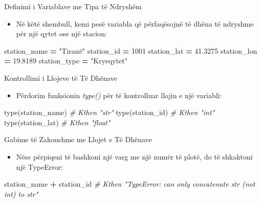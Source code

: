 \documentclass[
  ignorenonframetext,
]{beamer}
\newenvironment{Shaded}{\begin{snugshade}}{\end{snugshade}}
\newcommand{\BuiltInTok}[1]{#1}
\newcommand{\CommentTok}[1]{\textcolor[rgb]{0.56,0.35,0.01}{\textit{#1}}}
\newcommand{\DecValTok}[1]{\textcolor[rgb]{0.00,0.00,0.81}{#1}}
\newcommand{\FloatTok}[1]{\textcolor[rgb]{0.00,0.00,0.81}{#1}}
\newcommand{\NormalTok}[1]{#1}
\newcommand{\OperatorTok}[1]{\textcolor[rgb]{0.81,0.36,0.00}{\textbf{#1}}}
\newcommand{\StringTok}[1]{\textcolor[rgb]{0.31,0.60,0.02}{#1}}
\providecommand{\tightlist}{%
  \setlength{\itemsep}{0pt}\setlength{\parskip}{0pt}}
\begin{document}
\begin{frame}[fragile]{Definimi i Variablave me Tipa të Ndryshëm}
\protect\hypertarget{definimi-i-variablave-me-tipa-tuxeb-ndryshuxebm}{}
\begin{itemize}
\tightlist
\item
  Në këtë shembull, kemi pesë variabla që përfaqësojnë të dhëna të
  ndryshme për një qytet ose një stacion:
\end{itemize}

\begin{Shaded}
\begin{Highlighting}[]
\NormalTok{  station\_name }\OperatorTok{=} \StringTok{"Tiranë"}
\NormalTok{  station\_id }\OperatorTok{=} \DecValTok{1001}
\NormalTok{  station\_lat }\OperatorTok{=} \FloatTok{41.3275}
\NormalTok{  station\_lon }\OperatorTok{=} \FloatTok{19.8189}
\NormalTok{  station\_type }\OperatorTok{=} \StringTok{"Kryeqytet"}
\end{Highlighting}
\end{Shaded}
\end{frame}

\begin{frame}[fragile]{Kontrollimi i Llojeve të Të Dhënave}
\protect\hypertarget{kontrollimi-i-llojeve-tuxeb-tuxeb-dhuxebnave}{}
\begin{itemize}
\tightlist
\item
  Përdorim funksionin \emph{type()} për të kontrolluar llojin e një
  variabli:
\end{itemize}

\begin{Shaded}
\begin{Highlighting}[]
\BuiltInTok{type}\NormalTok{(station\_name)  }\CommentTok{\# Kthen "str"}
\BuiltInTok{type}\NormalTok{(station\_id)  }\CommentTok{\# Kthen "int"}
\BuiltInTok{type}\NormalTok{(station\_lat)  }\CommentTok{\# Kthen "float"}
\end{Highlighting}
\end{Shaded}
\end{frame}

\begin{frame}[fragile]{Gabime të Zakonshme me Llojet e Të Dhënave}
\protect\hypertarget{gabime-tuxeb-zakonshme-me-llojet-e-tuxeb-dhuxebnave}{}
\begin{itemize}
\tightlist
\item
  Nëse përpiqeni të bashkoni një varg me një numër të plotë, do të
  shkaktoni një TypeError:
\end{itemize}

\begin{Shaded}
\begin{Highlighting}[]
\NormalTok{station\_name }\OperatorTok{+}\NormalTok{ station\_id  }\CommentTok{\# Kthen "TypeError: can only concatenate str (not \textquotesingle{}int\textquotesingle{}) to str"}
\end{Highlighting}
\end{Shaded}
\end{frame}
\end{document}
